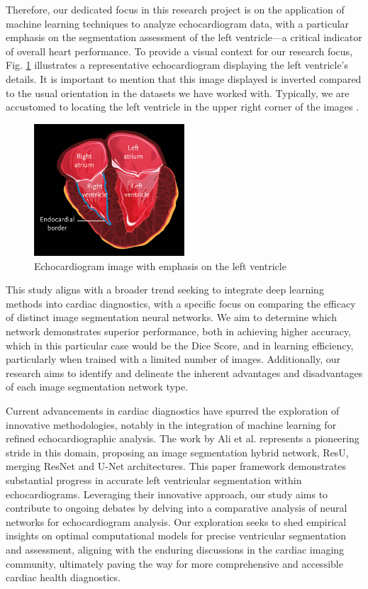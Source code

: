 \documentclass[runningheads]{llncs}
\begin{document}
Therefore, our dedicated focus in this research project is on the application of machine learning techniques to analyze echocardiogram data, with a particular emphasis on the segmentation assessment of the left ventricle—a critical indicator of overall heart performance. To provide a visual context for our research focus, Fig. \ref{fig:lv} illustrates a representative echocardiogram displaying the left ventricle's details. It is important to mention that this image displayed is inverted compared to the usual orientation in the datasets we have worked with. Typically, we are accustomed to locating the left ventricle in the upper right corner of the images \cite{cita}.

\begin{figure}[H]
  \centering
  \includegraphics[width=0.5\textwidth]{lv.jpeg}
  \caption{Echocardiogram image with emphasis on the left ventricle}
  \label{fig:lv}
\end{figure}

This study aligns with a broader trend seeking to integrate deep learning methods into cardiac diagnostics, with a specific focus on comparing the efficacy of distinct image segmentation neural networks. We aim to determine which network demonstrates superior performance, both in achieving higher accuracy, which in this particular case would be the Dice Score, and in learning efficiency, particularly when trained with a limited number of images. Additionally, our research aims to identify and delineate the inherent advantages and disadvantages of each image segmentation network type. 

Current advancements in cardiac diagnostics have spurred the exploration of innovative methodologies, notably in the integration of machine learning for refined echocardiographic analysis. The work by Ali et al. \cite{a} represents a pioneering stride in this domain, proposing an image segmentation hybrid network, ResU, merging ResNet and U-Net architectures. This paper framework demonstrates substantial progress in accurate left ventricular segmentation within echocardiograms. Leveraging their innovative approach, our study aims to contribute to ongoing debates by delving into a comparative analysis of neural networks for echocardiogram analysis. Our exploration seeks to shed empirical insights on optimal computational models for precise ventricular segmentation and assessment, aligning with the enduring discussions in the cardiac imaging community, ultimately paving the way for more comprehensive and accessible cardiac health diagnostics.   
\end{document}
